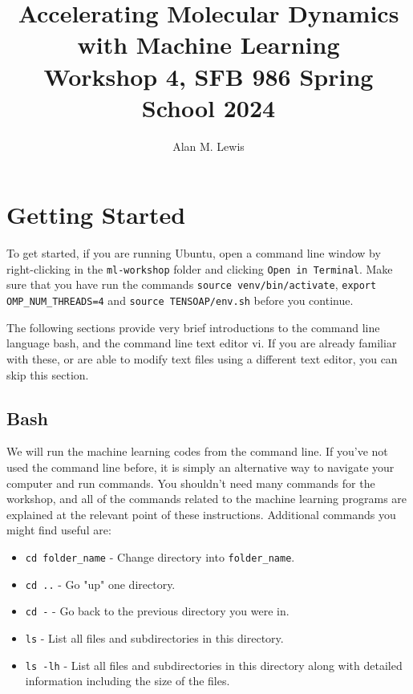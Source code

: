 \documentclass{article}
\title{Accelerating Molecular Dynamics with Machine Learning \\ Workshop 4, SFB 986 Spring School 2024}
\author{Alan M. Lewis}
\date{}
\begin{document}
\maketitle

\section{Getting Started}


To get started, if you are running Ubuntu, open a command line window by right-clicking in the \verb|ml-workshop| folder and clicking \verb|Open in Terminal|. Make sure that you have run the commands \verb|source venv/bin/activate|, \verb|export OMP_NUM_THREADS=4| and \verb|source TENSOAP/env.sh| before you continue.

The following sections provide very brief introductions to the command line language bash, and the command line text editor vi. If you are already familiar with these, or are able to modify text files using a different text editor, you can skip this section.

\subsection{Bash}

We will run the machine learning codes from the command line. If you've not used the command line before, it is simply an alternative way to navigate your computer and run commands. You shouldn't need many commands for the workshop, and all of the commands related to the machine learning programs are explained at the relevant point of these instructions. Additional commands you might find useful are:

\begin{itemize}

\item \verb|cd folder_name| - Change directory into \verb|folder_name|.
\item \verb|cd ..| - Go "up" one directory.
\item \verb|cd -| - Go back to the previous directory you were in.
\item \verb|ls| - List all files and subdirectories in this directory.
\item \verb|ls -lh| - List all files and subdirectories in this directory along with detailed information including the size of the files.

\end{itemize}
\end{document}
